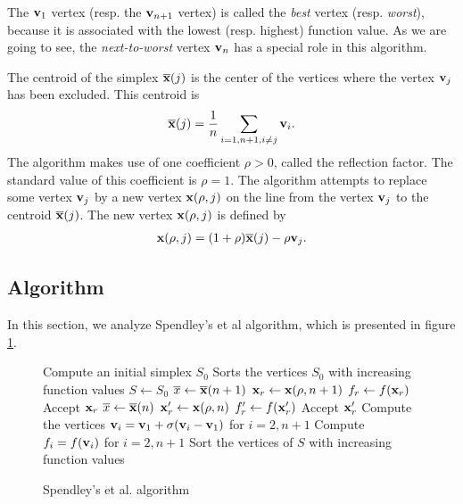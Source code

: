 The $\mathbf{v}_1$ vertex (resp. the $\mathbf{v}_{n+1}$ vertex) is called the \emph{best} 
vertex (resp. \emph{worst}), because it is associated with the lowest (resp. highest)
function value. As we are going to see, the \emph{next-to-worst} vertex $\mathbf{v}_n$ has a 
special role in this algorithm.

The centroid of the simplex $\overline{\mathbf{x}} (j)$ is the center of the vertices
where the vertex $\mathbf{v}_j$ has been 
excluded. This centroid is 
\begin{eqnarray}
\label{sp-centroid-generalized}
\overline{\mathbf{x}} (j) = \frac{1}{n} \sum_{i=1,n+1, i\neq j} \mathbf{v}_i.
\end{eqnarray}
The algorithm makes use
of one coefficient $\rho>0$, called the reflection factor. The standard
value of this coefficient is $\rho=1$.
The algorithm attempts to replace some vertex 
$\mathbf{v}_j$ by a new vertex $\mathbf{x}(\rho,j)$ on the line from the vertex $\mathbf{v}_j$
to the centroid  $\overline{\mathbf{x}}(j)$. The new vertex $\mathbf{x}(\rho,j)$ is defined by 
\begin{eqnarray}
\label{sp-interpolate-generalized}
\mathbf{x}(\rho,j) = (1+\rho)\overline{\mathbf{x}}(j) - \rho \mathbf{v}_j.
\end{eqnarray}

\subsection{Algorithm}

In this section, we analyze Spendley's et al algorithm, which
is presented in figure \ref{algo-spendley}.

\begin{figure}[htbp]
\begin{algorithmic}
\STATE Compute an initial simplex $S_0$
\STATE Sorts the vertices $S_0$ with increasing function values
\STATE $S\gets S_0$
  \STATE $\overline{x}\gets \overline{\mathbf{x}}(n+1)$ 
  \STATE $\mathbf{x}_r \gets \mathbf{x}(\rho,n+1)$ 
  \STATE $f_r \gets f(\mathbf{x}_r)$ 
    \STATE Accept $\mathbf{x}_r$
  \ELSE
    \STATE $\overline{x}\gets \overline{\mathbf{x}}(n)$ 
    \STATE $\mathbf{x}_r^\prime \gets \mathbf{x}(\rho,n)$ 
    \STATE $f_r^\prime \gets f(\mathbf{x}_r^\prime)$ 
      \STATE Accept $\mathbf{x}_r^\prime$
    \ELSE 
      \STATE Compute the vertices $\mathbf{v}_i=\mathbf{v}_1 + \sigma (\mathbf{v}_i - \mathbf{v}_1)$ for $i=2,n+1$ 
      \STATE Compute $f_i = f(\mathbf{v}_i)$ for $i=2,n+1$
    \ENDIF
  \ENDIF
  \STATE Sort the vertices of $S$ with increasing function values
\ENDWHILE
\end{algorithmic}
\caption{Spendley's et al. algorithm}
\label{algo-spendley}
\end{figure}

